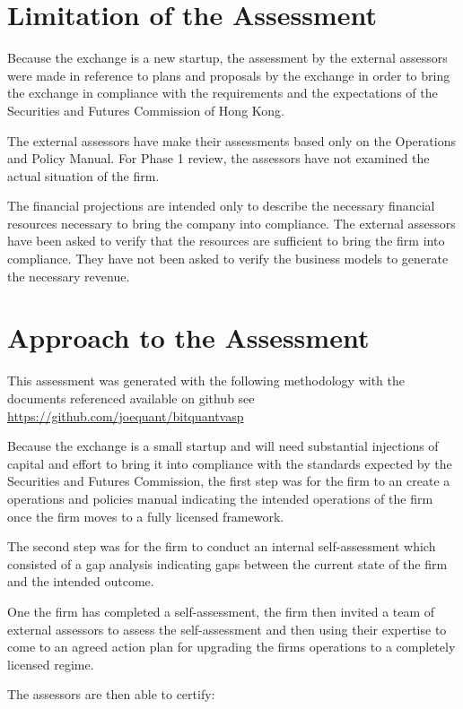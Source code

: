 \documentclass[]{report}
\begin{document}
\section{Limitation of the Assessment}
Because the exchange is a new startup, the assessment by the external
assessors were made in reference to plans and proposals by the
exchange in order to bring the exchange in compliance with the
requirements and the expectations of the Securities and Futures
Commission of Hong Kong.

The external assessors have make their assessments based only on the
Operations and Policy Manual.  For Phase 1 review, the assessors have
not examined the actual situation of the firm.

The financial projections are intended only to describe the necessary
financial resources necessary to bring the company into compliance.
The external assessors have been asked to verify that the resources
are sufficient to bring the firm into compliance.  They have not been
asked to verify the business models to generate the necessary revenue.

\section{Approach to the Assessment}

This assessment was generated with the following methodology with the
documents referenced available on github see
\href{https://github.com/joequant/bitquant\-vasp}{https://github.com/joequant/bitquant\-vasp}

Because the exchange is a small startup and will need substantial
injections of capital and effort to bring it into compliance with the
standards expected by the Securities and Futures Commission, the first
step was for the firm to an create a operations and policies manual
indicating the intended operations of the firm once the firm moves to
a fully licensed framework.

The second step was for the firm to conduct an internal
self-assessment which consisted of a gap analysis indicating gaps
between the current state of the firm and the intended outcome.

One the firm has completed a self-assessment, the firm then invited a
team of external assessors to assess the self-assessment and then
using their expertise to come to an agreed action plan for upgrading
the firms operations to a completely licensed regime.

The assessors are then able to certify:
\end{document}
